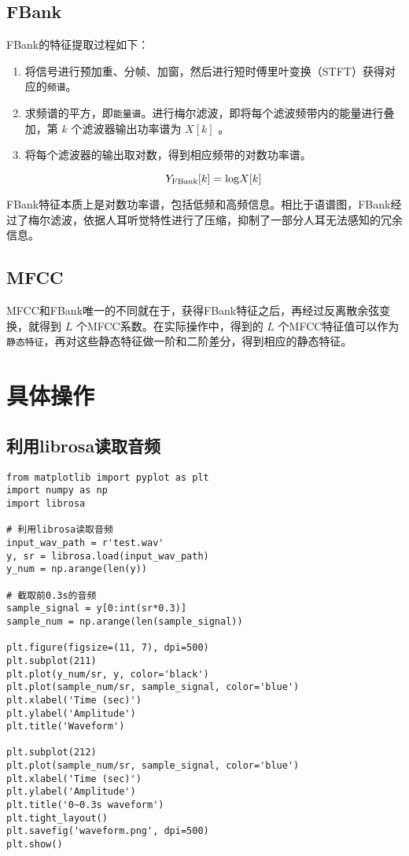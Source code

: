 \documentclass[cn,10pt,math=newtx,citestyle=gb7714-2015,bibstyle=gb7714-2015]{elegantbook}
\begin{document}
\subsection{FBank}

FBank的特征提取过程如下：

\begin{enumerate}
  \item 将信号进行预加重、分帧、加窗，然后进行短时傅里叶变换（STFT）获得对应的\lstinline{频谱}。
  \item 求频谱的平方，即\lstinline{能量谱}。进行梅尔滤波，即将每个滤波频带内的能量进行叠加，第 $k$ 个滤波器输出功率谱为 $X[k]$ 。
  \item 将每个滤波器的输出取对数，得到相应频带的对数功率谱。
  
  \begin{equation}
    Y_{\rm FBank}[k]={\rm log}X[k]
  \end{equation}
\end{enumerate}

FBank特征本质上是对数功率谱，包括低频和高频信息。相比于语谱图，FBank经过了梅尔滤波，依据人耳听觉特性进行了压缩，抑制了一部分人耳无法感知的冗余信息。

\subsection{MFCC}

MFCC和FBank唯一的不同就在于，获得FBank特征之后，再经过反离散余弦变换，就得到 $L$ 个MFCC系数。在实际操作中，得到的 $L$ 个MFCC特征值可以作为\lstinline{静态特征}，再对这些静态特征做一阶和二阶差分，得到相应的静态特征。

\section{具体操作}

\subsection{利用librosa读取音频}

\begin{lstlisting}
from matplotlib import pyplot as plt
import numpy as np
import librosa

# 利用librosa读取音频
input_wav_path = r'test.wav'
y, sr = librosa.load(input_wav_path)
y_num = np.arange(len(y))

# 截取前0.3s的音频
sample_signal = y[0:int(sr*0.3)]
sample_num = np.arange(len(sample_signal))

plt.figure(figsize=(11, 7), dpi=500)
plt.subplot(211)
plt.plot(y_num/sr, y, color='black')
plt.plot(sample_num/sr, sample_signal, color='blue')
plt.xlabel('Time (sec)')
plt.ylabel('Amplitude')
plt.title('Waveform')

plt.subplot(212)
plt.plot(sample_num/sr, sample_signal, color='blue')
plt.xlabel('Time (sec)')
plt.ylabel('Amplitude')
plt.title('0~0.3s waveform')
plt.tight_layout()
plt.savefig('waveform.png', dpi=500)
plt.show()
\end{lstlisting}
\end{document}
